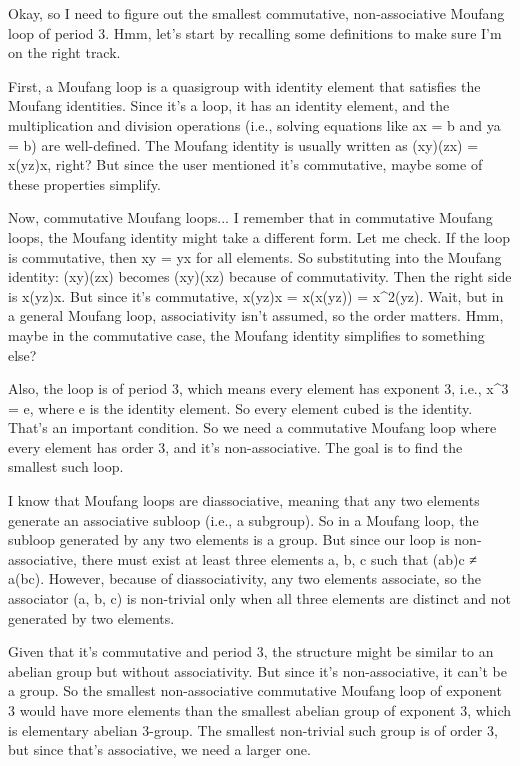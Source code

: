 \documentclass[12p]{article}
\newcounter{reasoningcounter}
\newenvironment{reasoning}[1][]
{\refstepcounter{reasoningcounter}%
\begin{tcolorbox}[
    title=Reasoning \thereasoningcounter: #1,
    colback=white, %
    colframe=gray,
    coltext=black, %
    fonttitle=\bfseries\normalsize,
    top=2mm,
    bottom=2mm,
    enlarge top initially by=5mm
]
\small
}
{\end{tcolorbox}}
\begin{document}
\begin{reasoning}
Okay, so I need to figure out the smallest commutative, non-associative Moufang loop of period 3. Hmm, let's start by recalling some definitions to make sure I'm on the right track.

First, a Moufang loop is a quasigroup with identity element that satisfies the Moufang identities. Since it's a loop, it has an identity element, and the multiplication and division operations (i.e., solving equations like ax = b and ya = b) are well-defined. The Moufang identity is usually written as (xy)(zx) = x(yz)x, right? But since the user mentioned it's commutative, maybe some of these properties simplify.

Now, commutative Moufang loops... I remember that in commutative Moufang loops, the Moufang identity might take a different form. Let me check. If the loop is commutative, then xy = yx for all elements. So substituting into the Moufang identity: (xy)(zx) becomes (xy)(xz) because of commutativity. Then the right side is x(yz)x. But since it's commutative, x(yz)x = x(x(yz)) = x^2(yz). Wait, but in a general Moufang loop, associativity isn't assumed, so the order matters. Hmm, maybe in the commutative case, the Moufang identity simplifies to something else?

Also, the loop is of period 3, which means every element has exponent 3, i.e., x^3 = e, where e is the identity element. So every element cubed is the identity. That's an important condition. So we need a commutative Moufang loop where every element has order 3, and it's non-associative. The goal is to find the smallest such loop.

I know that Moufang loops are diassociative, meaning that any two elements generate an associative subloop (i.e., a subgroup). So in a Moufang loop, the subloop generated by any two elements is a group. But since our loop is non-associative, there must exist at least three elements a, b, c such that (ab)c ≠ a(bc). However, because of diassociativity, any two elements associate, so the associator (a, b, c) is non-trivial only when all three elements are distinct and not generated by two elements.

Given that it's commutative and period 3, the structure might be similar to an abelian group but without associativity. But since it's non-associative, it can't be a group. So the smallest non-associative commutative Moufang loop of exponent 3 would have more elements than the smallest abelian group of exponent 3, which is elementary abelian 3-group. The smallest non-trivial such group is of order 3, but since that's associative, we need a larger one.


\end{reasoning}
\end{document}
